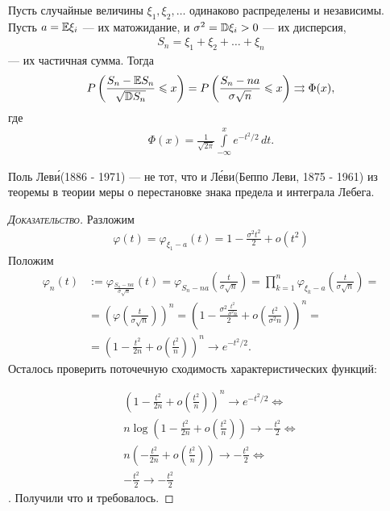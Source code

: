 \documentclass[../main.tex]{subfiles}
\begin{document}
\begin{thm}
 \label{theorem:central_limit_theorem_Levi}
 Пусть случайные величины $ \xi_1, \xi_2, \ldots $  одинаково распределены и независимы. Пусть $ a = \mathbb E \xi_i $ --- их матожидание, и  $ \sigma^{2} = \mathbb D \xi_i > 0 $  --- их дисперсия,
 \begin{align*}
  S_n = \xi_1 + \xi_2 + \ldots + \xi_n
 \end{align*} --- их частичная сумма. Тогда
 \begin{align*}
  P\left(\frac{S_n - \mathbb E S_n}{\sqrt{\mathbb D S_n}} \leqslant x\right) = P \left( \frac{S_n - na}{\sigma \sqrt n} \leqslant x \right) \rightrightarrows \Phi(x),
 \end{align*} где
 \begin{align*}
  \Phi(x) = \frac{1}{\sqrt{2\pi}} \int\limits_{-\infty}^{x} e^{-t^{2} / 2}\,dt.
 \end{align*}
\end{thm}
\begin{remrk*}
 Поль Лев\'{и}(1886 - 1971) --- не тот, что и Л\'{е}ви(Беппо Леви, 1875 - 1961) из теоремы в теории меры о перестановке знака предела и интеграла Лебега.
\end{remrk*}
\begin{proof}[\normalfont\textsc{Доказательство}]
 Разложим
 \begin{align*}
  \varphi(t) = \varphi_{\xi_1 - a}(t) = 1 - \frac{\sigma^{2}t^{2}}{2} + o(t^{2})
 \end{align*} Положим
 \begin{align*}
  \varphi_n(t) &:= \varphi_{\frac{S_n - na}{\sigma \sqrt n}}(t) = \varphi_{S_n - na} \left( \frac{t}{\sigma \sqrt n} \right) = \prod_{k=1}^{n} \varphi_{\xi_k - a} \left( \frac{t}{\sigma \sqrt n} \right) = \\
  &= \left(\varphi \left( \frac{t}{\sigma \sqrt n} \right) \right)^{n} = \left( 1- \frac{\sigma^{2} \frac{t^{2}}{\sigma^{2} n}}{2} + o \left( \frac{t^{2}}{\sigma^{2} n} \right) \right)^{n} = \\
  &= \left( 1 - \frac{t^{2}}{2n} + o \left( \frac{t^{2}}{n} \right) \right)^{n} \to e^{-t^{2} / 2}.
 \end{align*} Осталось проверить поточечную сходимость характеристических функций:

 \begin{align*}
  \left(1 - \frac{t^2}{2n} + o\left(\frac{t^2}{n}\right)\right)^{n} \to e^{-t^2/2} \Longleftrightarrow \\
  n \log \left(1 - \frac{t^2}{2n} + o\left(\frac{t^2}{n}\right)\right) \to - \frac{t^2}{2} \Longleftrightarrow \\
  n \left(-\frac{t^2}{2n} + o\left(\frac{t^2}{n}\right)\right) \to -\frac{t^2}{2} \Longleftrightarrow \\
  -\frac{t^2}{2} \to -\frac{t^2}{2}
 \end{align*}. Получили что и требовалось.

\end{proof}
\end{document}
